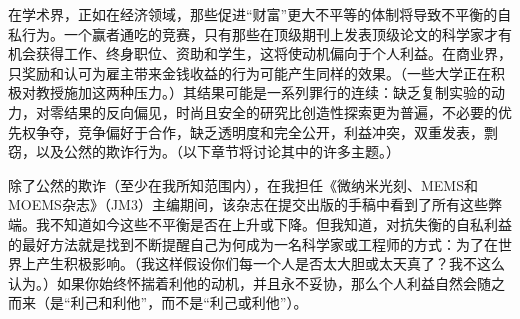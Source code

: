 在学术界，正如在经济领域，那些促进“财富”更大不平等的体制将导致不平衡的自私行为。一个赢者通吃的竞赛，只有那些在顶级期刊上发表顶级论文的科学家才有机会获得工作、终身职位、资助和学生，这将使动机偏向于个人利益。在商业界，只奖励和认可为雇主带来金钱收益的行为可能产生同样的效果。（一些大学正在积极对教授施加这两种压力。）其结果可能是一系列罪行的连续：缺乏复制实验的动力，对零结果的反向偏见，时尚且安全的研究比创造性探索更为普遍，不必要的优先权争夺，竞争偏好于合作，缺乏透明度和完全公开，利益冲突，双重发表，剽窃，以及公然的欺诈行为。（以下章节将讨论其中的许多主题。）

除了公然的欺诈（至少在我所知范围内），在我担任《微纳米光刻、MEMS和MOEMS杂志》（JM3）主编期间，该杂志在提交出版的手稿中看到了所有这些弊端。我不知道如今这些不平衡是否在上升或下降。但我知道，对抗失衡的自私利益的最好方法就是找到不断提醒自己为何成为一名科学家或工程师的方式：为了在世界上产生积极影响。（我这样假设你们每一个人是否太大胆或太天真了？我不这么认为。）如果你始终怀揣着利他的动机，并且永不妥协，那么个人利益自然会随之而来（是“利己和利他”，而不是“利己或利他”）。

